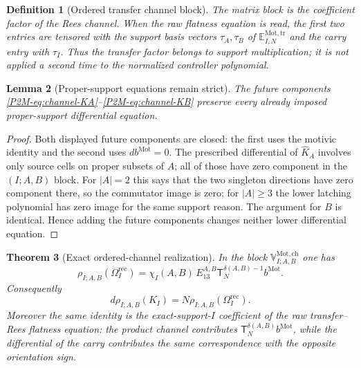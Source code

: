 \documentclass[11pt]{article}
\newtheorem{theorem}{Theorem}[section]
\newtheorem{lemma}[theorem]{Lemma}
\newtheorem{definition}[theorem]{Definition}
\theoremstyle{remark}
\newcommand{\Mot}{\mathrm{Mot}}
\begin{document}
\begin{definition}[Ordered transfer channel block]
The matrix block is the coefficient factor of the Rees channel.  When the raw
flatness equation is read, the first two entries are tensored with the support
basis vectors $\tau_A,\tau_B$ of
$\mathbb E^{\Mot,\mathrm{tr}}_{I,N}$ and the carry entry with $\tau_I$.
Thus the transfer factor belongs to support multiplication; it is not applied
a second time to the normalized controller polynomial.
\end{definition}

\begin{lemma}[Proper-support equations remain strict]
\label{P2M-lem:channel-proper-equations}
The future components \eqref{P2M-eq:channel-KA}--\eqref{P2M-eq:channel-KB} preserve
every already imposed proper-support differential equation.
\end{lemma}

\begin{proof}
Both displayed future components are closed: the first uses the motivic
identity and the second uses $db^{\Mot}=0$.  The prescribed differential of
$\widehat K_A$ involves only source cells on proper subsets of $A$; all of
those have zero component in the $(I;A,B)$ block.  For $|A|=2$ this says that
the two singleton directions have zero component there, so the commutator
image is zero; for $|A|\ge3$ the lower latching polynomial has zero image for
the same support reason.  The argument for $B$ is identical.  Hence adding
the future components changes neither lower differential equation.
\end{proof}

\begin{theorem}[Exact ordered-channel realization]
\label{P2M-thm:ordered-channel-realization}
In the block $\mathbb V_{I;A,B}^{\Mot,\mathrm{ch}}$ one has
\begin{equation}
 \boxed{
 \rho_{I;A,B}(\Omega_I^{\mathrm{rec}})
 =\chi_I(A,B)\,
  E_{13}^{A,B}\mathsf T_N^{\delta(A,B)-1}b^{\Mot}.}
 \label{P2M-eq:channel-latching-image}
\end{equation}
Consequently
\begin{equation}
 \boxed{
 d\rho_{I;A,B}(K_I)
 =N\rho_{I;A,B}(\Omega_I^{\mathrm{rec}}).}
 \label{P2M-eq:channel-carry}
\end{equation}
Moreover the same identity is the exact-support-$I$ coefficient of the raw
transfer--Rees flatness equation: the product channel contributes
$\mathsf T_N^{\delta(A,B)}b^{\Mot}$, while the differential of the carry
contributes the same correspondence with the opposite orientation sign.
\end{theorem}
\end{document}

